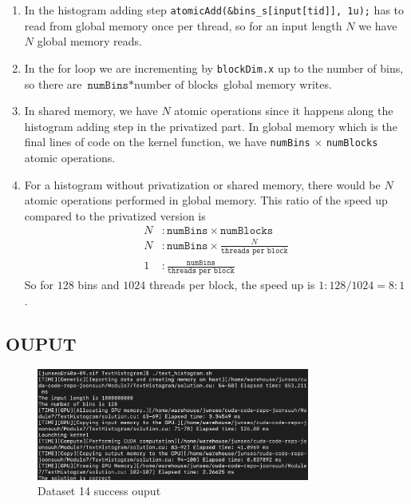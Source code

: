 \documentclass[../main.tex]{subfiles}
\begin{document}
\begin{enumerate}
    \item In the histogram adding step \texttt{atomicAdd(\&bins\_s[input[tid]], 1u);} has to
    read from global memory once per thread, so for an input length $N$ we have $N$ global memory
    reads.

    \item In the for loop we are incrementing by \texttt{blockDim.x} up to the number of bins, so
    there are $\texttt{numBins} * \textrm{number of blocks}$ global memory writes.

    \item In shared memory, we have $N$ atomic operations since it happens along the histogram
    adding step in the privatized part. In global memory which is the final lines of code on the
    kernel function, we have \texttt{numBins} $\times$ \texttt{numBlocks} atomic operations.

    \item For a histogram without privatization or shared memory, there would be $N$ atomic
    operations performed in global memory. This ratio of the speed up compared to the privatized
    version is
    \begin{align*}
        N &: \texttt{numBins} \times \texttt{numBlocks} \\
        N &: \texttt{numBins} \times \frac{N}{\texttt{threads per block}} \\
        1 &: \frac{\texttt{numBins}}{\texttt{threads per block}}
    \end{align*}
    So for $128$ bins and $1024$ threads per block, the speed up is $1 : 128 / 1024 = 8 : 1$.
    


\end{enumerate}

\newpage
\subsection*{OUPUT}
\begin{figure}[ht]
    \centering
    \includegraphics[width=0.8\textwidth]{texthistogram.png}
    \caption{Dataset 14 success ouput}
    \label{fig:texthistogram}
\end{figure}
\end{document}
